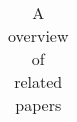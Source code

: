 \begin{landscape}
\begin{longtable}{|l|l|l|l|l|}
\caption{A overview of related papers} \label{rel} \\
\end{longtable}

\end{landscape}